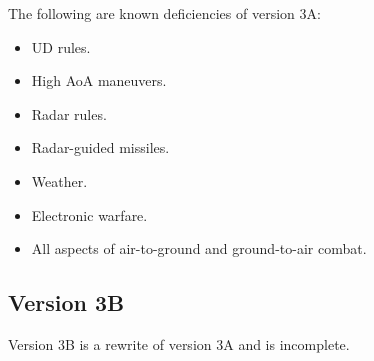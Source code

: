 \documentclass[10pt]{report}
\begin{document}
The following are known deficiencies of version 3A:
\begin{itemize}
\item UD rules.
\item High AoA maneuvers.
\item Radar rules.
\item Radar-guided missiles.
\item Weather.
\item Electronic warfare.
\item All aspects of air-to-ground and ground-to-air combat.
\end{itemize}


\subsection{Version 3B}

Version 3B is a rewrite of version 3A and is incomplete.
\end{document}
